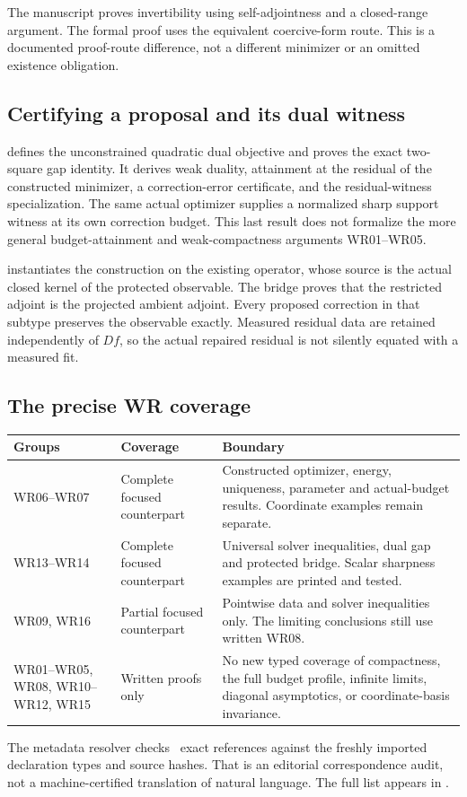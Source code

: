 \documentclass[11pt]{article}
\begin{document}
The manuscript proves invertibility using self-adjointness and a closed-range argument. The formal proof uses the equivalent coercive-form route. This is a documented proof-route difference, not a different minimizer or an omitted existence obligation.

\subsection{Certifying a proposal and its dual witness}
 defines the unconstrained quadratic dual objective and proves the exact two-square gap identity. It derives weak duality, attainment at the residual of the constructed minimizer, a correction-error certificate, and the residual-witness specialization. The same actual optimizer supplies a normalized sharp support witness at its own correction budget. This last result does not formalize the more general budget-attainment and weak-compactness arguments WR01--WR05.

 instantiates the construction on the existing  operator, whose source is the actual closed kernel of the protected observable. The bridge proves that the restricted adjoint is the projected ambient adjoint. Every proposed correction in that subtype preserves the observable exactly. Measured residual data are retained independently of $Df$, so the actual repaired residual is not silently equated with a measured fit.

\subsection{The precise WR coverage}
\begin{center}
\begin{tabularx}{\linewidth}{@{}p{.17\linewidth}p{.22\linewidth}X@{}}
\toprule Groups & Coverage & Boundary\\\midrule
WR06--WR07 & Complete focused counterpart & Constructed optimizer, energy, uniqueness, parameter and actual-budget results. Coordinate examples remain separate.\\[4pt]
WR13--WR14 & Complete focused counterpart & Universal solver inequalities, dual gap and protected bridge. Scalar sharpness examples are printed and tested.\\[4pt]
WR09, WR16 & Partial focused counterpart & Pointwise data and solver inequalities only. The limiting conclusions still use written WR08.\\[4pt]
WR01--WR05, WR08, WR10--WR12, WR15 & Written proofs only & No new typed coverage of compactness, the full budget profile, infinite limits, diagonal asymptotics, or coordinate-basis invariance.\\\bottomrule
\end{tabularx}
\end{center}
The metadata resolver checks \EditionFocusedReferences\ exact references against the freshly imported declaration types and source hashes. That is an editorial correspondence audit, not a machine-certified translation of natural language. The full list appears in .
\end{document}
